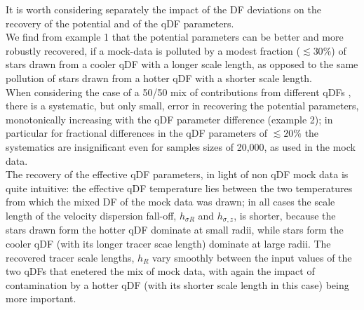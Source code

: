 It is worth considering separately the impact of the DF deviations on the recovery of the potential and of the qDF parameters. 
\\We find from example 1 that the potential parameters can be better and more robustly recovered, if a mock-data \MAP is polluted by a modest fraction ($\lesssim 30\%$) of stars drawn from a cooler qDF with a longer scale length, as opposed to the same pollution of stars drawn from a hotter qDF with a shorter scale length. 
\\When considering the case of a 50/50 mix of contributions from different qDFs , there is a systematic, but only small, error in recovering the potential parameters, monotonically increasing with the qDF parameter difference (example 2); in particular for fractional differences in the qDF parameters of $\lesssim 20\%$ the systematics are insignificant even for samples sizes of 20,000, as used in the mock data. 
\\The recovery of the effective qDF parameters, in light of non qDF mock data is quite intuitive: the effective qDF temperature lies between the two temperatures from which the mixed DF of the mock data was drawn; in all cases the scale length of the velocity dispersion fall-off, $h_{\sigma R}$ and $h_{\sigma , z}$, is shorter, because the stars drawn form the hotter qDF dominate at small radii, while stars form the cooler qDF (with its longer tracer scae length) dominate at large radii. The recovered tracer scale lengths, $h_R$ vary smoothly between the input values of the two qDFs that enetered the mix of mock data, with again the impact of contamination by a hotter qDF (with its shorter scale length in this case) being more important. 

